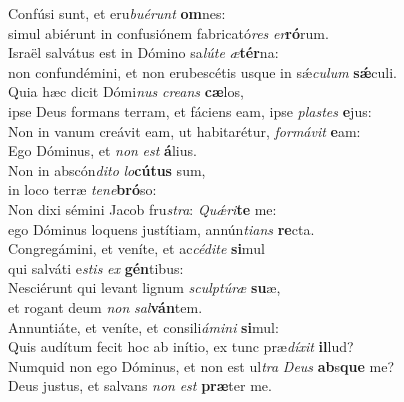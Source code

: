 \evenverse Confúsi sunt, et eru\textit{bu}\textit{é}\textit{runt} \textbf{om}nes:~\*\\
\evenverse simul abiérunt in confusiónem fabricató\textit{res} \textit{er}\textbf{ró}rum.\\
\oddverse Israël salvátus est in Dómino sa\textit{lú}\textit{te} \textit{æ}\textbf{tér}na:~\*\\
\oddverse non confundémini, et non erubescétis usque in sǽ\textit{cu}\textit{lum} \textbf{sǽ}culi.\\
\evenverse Quia hæc dicit Dómi\textit{nus} \textit{cre}\textit{ans} \textbf{cæ}los,~\*\\
\evenverse ipse Deus formans terram, et fáciens eam, ipse \textit{pla}\textit{stes} \textbf{e}jus:\\
\oddverse Non in vanum creávit eam, ut habitarétur, \textit{for}\textit{má}\textit{vit} \textbf{e}am:~\*\\
\oddverse Ego Dóminus, et \textit{non} \textit{est} \textbf{á}lius.\\
\evenverse Non in abscón\textit{di}\textit{to} \textit{lo}\textbf{cú}\textbf{tus} sum,~\*\\
\evenverse in loco terræ \textit{te}\textit{ne}\textbf{bró}so:\\
\oddverse Non dixi sémini Jacob fru\textit{stra}: \textit{Quǽ}\textit{ri}\textbf{te} me:~\*\\
\oddverse ego Dóminus loquens justítiam, annún\textit{ti}\textit{ans} \textbf{re}cta.\\
\evenverse Congregámini, et veníte, et ac\textit{cé}\textit{di}\textit{te} \textbf{si}mul~\*\\
\evenverse qui salváti e\textit{stis} \textit{ex} \textbf{gén}tibus:\\
\oddverse Nesciérunt qui levant lignum \textit{scul}\textit{ptú}\textit{ræ} \textbf{su}æ,~\*\\
\oddverse et rogant deum \textit{non} \textit{sal}\textbf{ván}tem.\\
\evenverse Annuntiáte, et veníte, et consili\textit{á}\textit{mi}\textit{ni} \textbf{si}mul:~\*\\
\evenverse Quis audítum fecit hoc ab inítio, ex tunc præ\textit{dí}\textit{xit} \textbf{il}lud?\\
\oddverse Numquid non ego Dóminus, et non est ul\textit{tra} \textit{De}\textit{us} \textbf{ab}s\textbf{que} me?~\*\\
\oddverse Deus justus, et salvans \textit{non} \textit{est} \textbf{præ}ter me.\\
